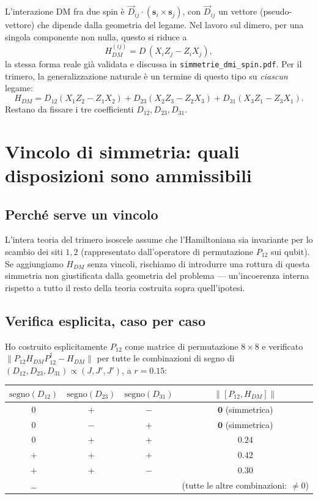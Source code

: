 \documentclass[11pt,a4paper]{article}
\newcommand{\vs}[1]{\mathbf{s}_{#1}}
\begin{document}
L'interazione DM fra due spin è $\vec D_{ij}\cdot(\vs i\times\vs j)$, con $\vec
D_{ij}$ un vettore (pseudo-vettore) che dipende dalla geometria del legame. Nel lavoro
sul dimero, per una singola componente non nulla, questo si riduce a
\[
H_{DM}^{(ij)} = D\,(X_iZ_j - Z_iX_j),
\]
la stessa forma reale già validata e discussa in \texttt{simmetrie\_dmi\_spin.pdf}. Per
il trimero, la generalizzazione naturale è un termine di questo tipo su \emph{ciascun}
legame:
\[
H_{DM} = D_{12}(X_1Z_2-Z_1X_2) + D_{23}(X_2Z_3-Z_2X_3) + D_{31}(X_3Z_1-Z_3X_1).
\]
Restano da fissare i tre coefficienti $D_{12},D_{23},D_{31}$.

\section{Vincolo di simmetria: quali disposizioni sono ammissibili}

\subsection{Perché serve un vincolo}

L'intera teoria del trimero isoscele assume che l'Hamiltoniana sia invariante per lo
scambio dei siti $1,2$ (rappresentato dall'operatore di permutazione $P_{12}$ sui
qubit). Se aggiungiamo $H_{DM}$ senza vincoli, rischiamo di introdurre una rottura di
questa simmetria non giustificata dalla geometria del problema — un'incoerenza interna
rispetto a tutto il resto della teoria costruita sopra quell'ipotesi.

\subsection{Verifica esplicita, caso per caso}

Ho costruito esplicitamente $P_{12}$ come matrice di permutazione $8\times8$ e
verificato $\|P_{12}H_{DM}P_{12}^\dagger - H_{DM}\|$ per tutte le combinazioni di
segno di $(D_{12},D_{23},D_{31})\propto(J,J',J')$, a $r=0.15$:

\begin{center}
\renewcommand{\arraystretch}{1.25}
\begin{tabular}{cccc}
\toprule
$\mathrm{segno}(D_{12})$ & $\mathrm{segno}(D_{23})$ & $\mathrm{segno}(D_{31})$ & $\|[P_{12},H_{DM}]\|$ \\
\midrule
$0$ & $+$ & $-$ & $\mathbf{0}$ \quad (simmetrica) \\
$0$ & $-$ & $+$ & $\mathbf{0}$ \quad (simmetrica) \\
$0$ & $+$ & $+$ & $0.24$ \\
$+$ & $+$ & $+$ & $0.42$ \\
$+$ & $+$ & $-$ & $0.30$ \\
\ldots & & & (tutte le altre combinazioni: $\neq0$) \\
\bottomrule
\end{tabular}
\end{center}
\end{document}

